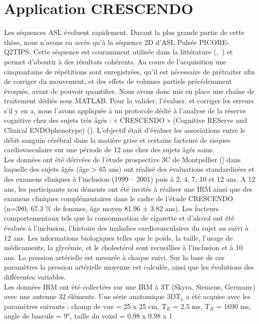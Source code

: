 \section{Application CRESCENDO}
Les séquences ASL évoluent rapidement. Durant la plus grande partie de cette thèse, nous
n’avons eu accès qu’à la séquence 2D d’ASL Pulsée PICORE-Q2TIPS. Cette séquence est couramment
utilisée dans la littérature (\cite{Bastos-Leite2008},~\cite{Haller2013}) et permet d’aboutir à des résultats cohérents. Au cours de
l’acquisition une cinquantaine de répétitions sont enregistrées, qu’il est nécessaire de prétraiter afin
de corriger du mouvement, et des effets de volumes partiels précédemment évoqués, avant de
pouvoir quantifier. Nous avons donc mis en place une chaîne de traitement dédiée sous MATLAB. Pour
la valider, l’évaluer, et corriger les erreurs s’il y en a, nous l’avons appliquée à un protocole dédié à
l’analyse de la réserve cognitive chez des sujets très âgés : « CRESCENDO » (Cognitive REServe and
Clinical ENDOphenotype) (\cite{Deverdun2015}). L’objectif était d’évaluer les associations entre le débit sanguin
cérébral dans la matière grise et certains facteurs de risques cardiovasculaire sur une période de 12
ans chez des sujets âgés sains.\\
Les données ont été dérivées de l’étude prospective 3C de Montpellier (\cite{Alperovitch2002}] dans laquelle des
sujets âgés (âge > 65 ans) ont réalisé des évaluations standardisées et des examens cliniques à
l’inclusion (1999 – 2001) puis à 2, 4, 7, 10 et 12 ans. A 12 ans, les participants non déments ont été
invités à réaliser une IRM ainsi que des examens cliniques complémentaires dans le cadre de l’étude
CRESCENDO (n=380, 67.3 \% de femmes, âge moyen 81.96 ± 3.82 ans). Les facteurs comportementaux
tels que la consommation de cigarette et d’alcool ont été évalués à l’inclusion, l’histoire des maladies
cardiovasculaires du sujet au suivi à 12 ans. Les informations biologiques telles que le poids, la taille,
l’usage de médicaments, la glycémie, et le cholestérol sont recueillies à l’inclusion et à 10 ans. La
pression artérielle est mesurée à chaque suivi. Sur la base de ces paramètres la pression artérielle
moyenne est calculée, ainsi que les évolutions des différentes variables.\\
Les données IRM ont été collectées sur une IRM à 3T (Skyra, Siemens, Germany) avec une
antenne 32 éléments. Une série anatomique 3DT$_1$ a été acquise avec les paramètres suivants : champ
de vue = 25 x 25 cm, T$_E$ = 2.5 ms, T$_R$ = 1690 ms, angle de bascule = 9°, taille du voxel = 0.98 x 0.98 x 1
